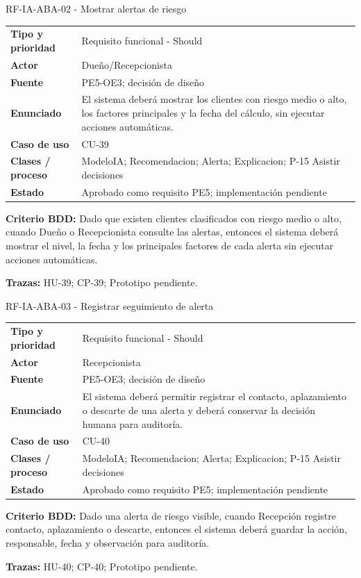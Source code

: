 \begin{reqbox}{RF-IA-ABA-02 - Mostrar alertas de riesgo}
\begin{tabularx}{\textwidth}{>{\bfseries}p{3.2cm}Y}
Tipo y prioridad & Requisito funcional - Should \\
Actor & Dueño/Recepcionista \\
Fuente & PE5-OE3; decisión de diseño \\
Enunciado & El sistema deberá mostrar los clientes con riesgo medio o alto, los factores principales y la fecha del cálculo, sin ejecutar acciones automáticas. \\
Caso de uso & CU-39 \\
Clases / proceso & ModeloIA; Recomendacion; Alerta; Explicacion; P-15 Asistir decisiones \\
Estado & Aprobado como requisito PE5; implementación pendiente \\
\end{tabularx}
\textbf{Criterio BDD:} Dado que existen clientes clasificados con riesgo medio o alto, cuando Dueño o Recepcionista consulte las alertas, entonces el sistema deberá mostrar el nivel, la fecha y los principales factores de cada alerta sin ejecutar acciones automáticas.

\textbf{Trazas:} HU-39; CP-39; Prototipo pendiente.
\end{reqbox}


\begin{reqbox}{RF-IA-ABA-03 - Registrar seguimiento de alerta}
\begin{tabularx}{\textwidth}{>{\bfseries}p{3.2cm}Y}
Tipo y prioridad & Requisito funcional - Should \\
Actor & Recepcionista \\
Fuente & PE5-OE3; decisión de diseño \\
Enunciado & El sistema deberá permitir registrar el contacto, aplazamiento o descarte de una alerta y deberá conservar la decisión humana para auditoría. \\
Caso de uso & CU-40 \\
Clases / proceso & ModeloIA; Recomendacion; Alerta; Explicacion; P-15 Asistir decisiones \\
Estado & Aprobado como requisito PE5; implementación pendiente \\
\end{tabularx}
\textbf{Criterio BDD:} Dado una alerta de riesgo visible, cuando Recepción registre contacto, aplazamiento o descarte, entonces el sistema deberá guardar la acción, responsable, fecha y observación para auditoría.

\textbf{Trazas:} HU-40; CP-40; Prototipo pendiente.
\end{reqbox}
